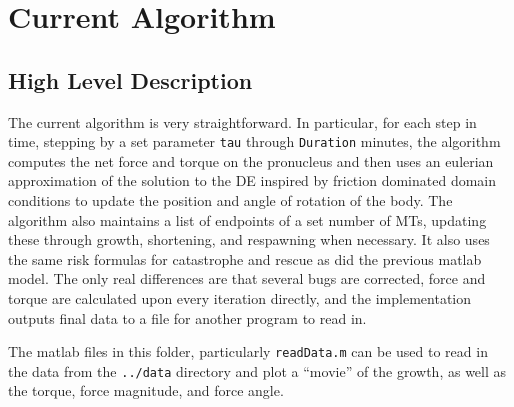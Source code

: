\documentclass{article}
\begin{document}
\section{Current Algorithm}
\subsection{High Level Description}
The current algorithm is very straightforward. In particular, for each step in
time, stepping by a set parameter \texttt{tau} through \texttt{Duration}
minutes, the algorithm computes the net force and torque on the pronucleus and
then uses an eulerian approximation of the solution to the DE inspired by
friction dominated domain conditions to update the position and angle of
rotation of the body. The algorithm also maintains a list of endpoints of a set
number of MTs, updating these through growth, shortening, and respawning when
necessary. It also uses the same risk formulas for catastrophe and rescue as did
the previous matlab model. The only real differences are that several bugs are
corrected, force and torque are calculated upon every iteration directly, and
the implementation outputs final data to a file for another program to read in. 

The matlab files in this folder, particularly \texttt{readData.m} can be used to
read in the data from the \texttt{../data} directory and plot a ``movie'' of the
growth, as well as the torque, force magnitude, and force angle. 
\end{document}
